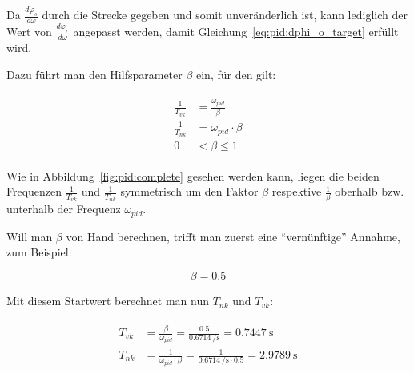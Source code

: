 Da   $\frac{d\varphi_s}{d\omega}$  durch   die  Strecke   gegeben  und   somit
unver\"anderlich ist, kann lediglich der Wert von $\frac{d\varphi_r}{d\omega}$
angepasst werden, damit Gleichung~\ref{eq:pid:dphi_o_target} erf\"ullt wird.

Dazu f\"uhrt man den Hilfsparameter $\beta$ ein, f\"ur den gilt:

\begin{gather} \label{eq:pid:beta:start}
    \begin{split}
        \frac{1}{T_{vk}} & = \frac{\omega_{pid}}{\beta} \\
        \frac{1}{T_{nk}} & = \omega_{pid} \cdot \beta  \\
                       0 & <  \beta \leq 1
    \end{split}
\end{gather}

Wie in  Abbildung~\ref{fig:pid:complete} gesehen  werden kann\footnotemark[8],
liegen  die   beiden  Frequenzen  $\frac{1}{T_{vk}}$   und  $\frac{1}{T_{nk}}$
symmetrisch um  den Faktor $\beta$ respektive  $\frac{1}{\beta}$ oberhalb bzw.
unterhalb der Frequenz $\omega_{pid}$.



Will man $\beta$ von Hand  berechnen, trifft man zuerst eine ``vern\"unftige''
Annahme, zum Beispiel:

\begin{equation} \label{eq:pid:beta:initial_value}
    \beta = 0.5
\end{equation}

Mit diesem Startwert berechnet man nun $T_{nk}$ und ${T_{vk}}$:

\begin{gather} \label{eq:pid:t_nk_t_vk_initial_results}
    \begin{split}
        {T_{vk}} & = \frac{\beta}{\omega_{pid}}  = \frac{0.5}{\SI{0.6714}{\per\second}}                   = \SI{0.7447}{\second} \\
        {T_{nk}} & = \frac{1}{\omega_{pid} \cdot \beta} = \frac{1}{\SI{0.6714}{\per\second} \cdot 0.5 }  = \SI{2.9789}{\second} \\
    \end{split}
\end{gather}

